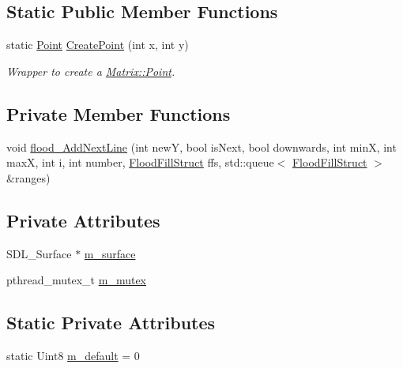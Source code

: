\subsection*{Static Public Member Functions}
\begin{DoxyCompactItemize}
\item 
static \hyperlink{structMatrix_1_1Point}{Point} \hyperlink{classMatrix_a39929c70aea7926beaf183b374239558}{CreatePoint} (int x, int y)
\begin{DoxyCompactList}\small\item\em Wrapper to create a \hyperlink{structMatrix_1_1Point}{Matrix::Point}. \item\end{DoxyCompactList}\end{DoxyCompactItemize}
\subsection*{Private Member Functions}
\begin{DoxyCompactItemize}
\item 
void \hyperlink{classMatrix_aaa3962d9bf27f654bd6771a8d5bfaeac}{flood\_\-AddNextLine} (int newY, bool isNext, bool downwards, int minX, int maxX, int i, int number, \hyperlink{structMatrix_1_1FloodFillStruct}{FloodFillStruct} ffs, std::queue$<$ \hyperlink{structMatrix_1_1FloodFillStruct}{FloodFillStruct} $>$ \&ranges)
\end{DoxyCompactItemize}
\subsection*{Private Attributes}
\begin{DoxyCompactItemize}
\item 
SDL\_\-Surface $\ast$ \hyperlink{classMatrix_a76ecc20ed053f699bcf299958be9f4a1}{m\_\-surface}
\item 
pthread\_\-mutex\_\-t \hyperlink{classMatrix_aba01078d3f7abfceae9f6ce1913bbdc3}{m\_\-mutex}
\end{DoxyCompactItemize}
\subsection*{Static Private Attributes}
\begin{DoxyCompactItemize}
\item 
static Uint8 \hyperlink{classMatrix_a128eca9782b86bae0eed3d1d0967249e}{m\_\-default} = 0
\end{DoxyCompactItemize}



